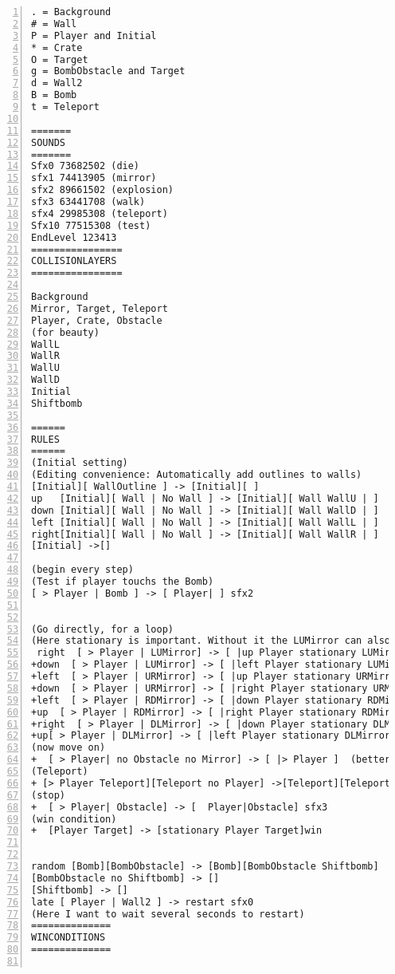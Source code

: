 \documentclass[11pt]{amsart}
\begin{document}
\begin{lstlisting}[numbers=left,numberstyle=\tiny,numbersep=10pt]
. = Background
# = Wall
P = Player and Initial
* = Crate
O = Target
g = BombObstacle and Target
d = Wall2
B = Bomb
t = Teleport

=======
SOUNDS
=======
Sfx0 73682502 (die)
sfx1 74413905 (mirror)
sfx2 89661502 (explosion)
sfx3 63441708 (walk)
sfx4 29985308 (teleport)
Sfx10 77515308 (test)
EndLevel 123413
================
COLLISIONLAYERS
================

Background
Mirror, Target, Teleport
Player, Crate, Obstacle
(for beauty)
WallL 
WallR 
WallU 
WallD 
Initial
Shiftbomb

======
RULES     
======  
(Initial setting)
(Editing convenience: Automatically add outlines to walls)
[Initial][ WallOutline ] -> [Initial][ ]
up   [Initial][ Wall | No Wall ] -> [Initial][ Wall WallU | ]
down [Initial][ Wall | No Wall ] -> [Initial][ Wall WallD | ]
left [Initial][ Wall | No Wall ] -> [Initial][ Wall WallL | ]
right[Initial][ Wall | No Wall ] -> [Initial][ Wall WallR | ]
[Initial] ->[]

(begin every step)
(Test if player touchs the Bomb)
[ > Player | Bomb ] -> [ Player| ] sfx2


(Go directly, for a loop)
(Here stationary is important. Without it the LUMirror can also move. And the Mirrors must be near the wall. Otherwise the player would go across the mirror. And be careful that never make a loop with mirrors and teleports!)
 right  [ > Player | LUMirror] -> [ |up Player stationary LUMirror ] sfx1 
+down  [ > Player | LUMirror] -> [ |left Player stationary LUMirror ] sfx1 
+left  [ > Player | URMirror] -> [ |up Player stationary URMirror ] sfx1 
+down  [ > Player | URMirror] -> [ |right Player stationary URMirror ] sfx1 
+left  [ > Player | RDMirror] -> [ |down Player stationary RDMirror ] sfx1 
+up  [ > Player | RDMirror] -> [ |right Player stationary RDMirror ] sfx1 
+right  [ > Player | DLMirror] -> [ |down Player stationary DLMirror ] sfx1 
+up[ > Player | DLMirror] -> [ |left Player stationary DLMirror ] sfx1 
(now move on)
+  [ > Player| no Obstacle no Mirror] -> [ |> Player ]  (better if one can wait for some time)
(Teleport)
+ [> Player Teleport][Teleport no Player] ->[Teleport][Teleport > Player] sfx4
(stop)
+  [ > Player| Obstacle] -> [  Player|Obstacle] sfx3
(win condition)
+  [Player Target] -> [stationary Player Target]win


random [Bomb][BombObstacle] -> [Bomb][BombObstacle Shiftbomb]
[BombObstacle no Shiftbomb] -> []
[Shiftbomb] -> []
late [ Player | Wall2 ] -> restart sfx0
(Here I want to wait several seconds to restart)
==============
WINCONDITIONS
==============


\end{lstlisting}
\end{document}
